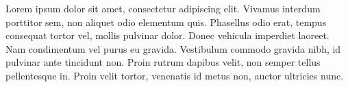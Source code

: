 \documentclass[9pt,a4paper,sans]{moderncv}
\date{29 Aprile, 2018}
\begin{document}
\makelettertitle


Lorem ipsum dolor sit amet, consectetur adipiscing elit. Vivamus interdum porttitor sem,
non aliquet odio elementum quis.\newline
Phasellus odio erat, tempus consequat tortor vel, mollis pulvinar dolor. Donec vehicula imperdiet laoreet.\newline
Nam condimentum vel purus eu gravida. Vestibulum commodo gravida nibh,
id pulvinar ante tincidunt non. Proin rutrum dapibus velit, non semper tellus pellentesque in.\newline
Proin velit tortor, venenatis id metus non, auctor ultricies nunc.\newline \newline

\makeletterclosing
\end{document}
